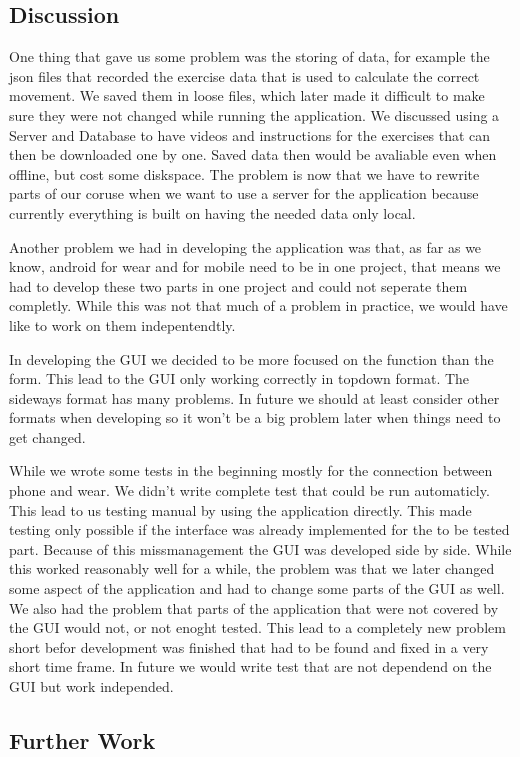 \subsection{Discussion}
One thing that gave us some problem was the storing of data, for example the json files that recorded the exercise data that is used to calculate the correct movement. We saved them in loose files, which later made it difficult to make sure they were not changed while running the application. We discussed using a Server and Database to have videos and instructions for the exercises that can then be downloaded one by one. Saved data then would be avaliable even when offline, but cost some diskspace. The problem is now that we have to rewrite parts of our coruse when we want to use a server for the application because currently everything is built on having the needed data only local.

Another problem we had in developing the application was that, as far as we know, android for wear and for mobile need to be in one project, that means we had to develop these two parts in one project and could not seperate them completly. While this was not that much of a problem in practice, we would have like to work on them indepentendtly.

In developing the GUI we decided to be more focused on the function than the form. This lead to the GUI only working correctly in topdown format. The sideways format has many problems. In future we should at least consider other formats when developing so it won't be a big problem later when things need to get changed.


While we wrote some tests in the beginning mostly for the connection between phone and wear. We didn't write complete test that could be run automaticly. This lead to us testing manual by using the application directly. This made testing only possible if the interface was already implemented for the to be tested part. 
Because of this missmanagement the GUI was developed side by side. While this worked reasonably well for a while, the problem was that we later changed some aspect of the application and had to change some parts of the GUI as well.
We also had the problem that parts of the application that were not covered by the GUI would not, or not enoght tested. This lead to a completely new problem short befor development was finished that had to be found and fixed in a very short time frame. 
In future we would write test that are not dependend on the GUI but work independed.
\subsection{Further Work}